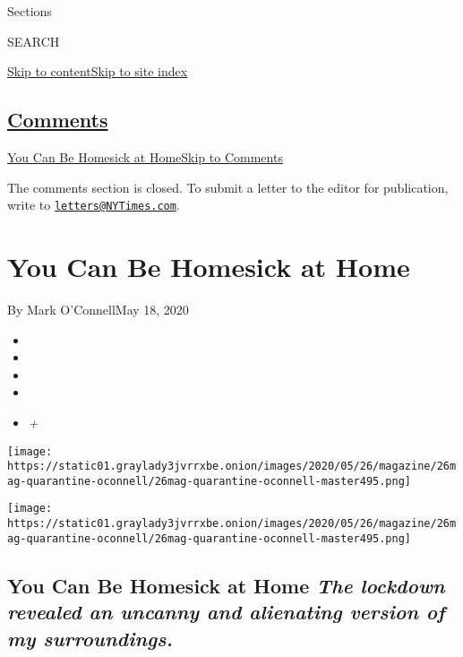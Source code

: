 Sections

SEARCH

\protect\hyperlink{site-content}{Skip to
content}\protect\hyperlink{site-index}{Skip to site index}

\hypertarget{comments}{%
\subsection{\texorpdfstring{\protect\hyperlink{commentsContainer}{Comments}}{Comments}}\label{comments}}

\href{}{You Can Be Homesick at Home}\href{}{Skip to Comments}

The comments section is closed. To submit a letter to the editor for
publication, write to
\href{mailto:letters@NYTimes.com}{\nolinkurl{letters@NYTimes.com}}.

\hypertarget{you-can-be-homesick-at-home}{%
\section{You Can Be Homesick at
Home}\label{you-can-be-homesick-at-home}}

By Mark O'ConnellMay 18, 2020

\begin{itemize}
\item
\item
\item
\item
\item
  \emph{+}
\end{itemize}

\texttt{[image: https://static01.graylady3jvrrxbe.onion/images/2020/05/26/magazine/26mag-quarantine-oconnell/26mag-quarantine-oconnell-master495.png]}

\texttt{[image: https://static01.graylady3jvrrxbe.onion/images/2020/05/26/magazine/26mag-quarantine-oconnell/26mag-quarantine-oconnell-master495.png]}

\hypertarget{you-can-be-homesick-at-home-the-lockdown-revealed-an-uncanny-and-alienating-version-of-my-surroundings}{%
\subsection{\texorpdfstring{You Can Be Homesick at Home \emph{The
lockdown revealed an uncanny and alienating version of my
surroundings.}}{You Can Be Homesick at Home The lockdown revealed an uncanny and alienating version of my surroundings.}}\label{you-can-be-homesick-at-home-the-lockdown-revealed-an-uncanny-and-alienating-version-of-my-surroundings}}

